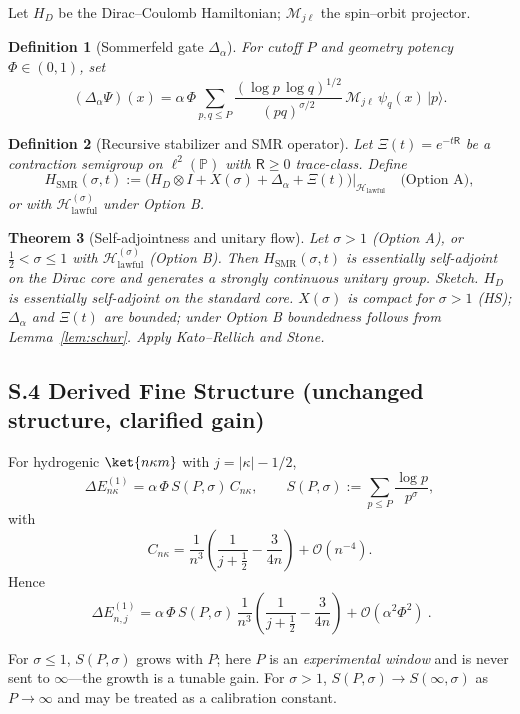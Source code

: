 \documentclass[12]{amsart}
\newtheorem{theorem}{Theorem}
\theoremstyle{plain}
\newtheorem{definition}[theorem]{Definition}
\begin{document}
Let $H_D$ be the Dirac–Coulomb Hamiltonian; $\mathcal M_{j\ell}$ the spin–orbit projector.

\begin{definition}[Sommerfeld gate $\Delta_\alpha$]
For cutoff $P$ and geometry potency $\Phi\in(0,1)$, set
\[
(\Delta_\alpha \Psi)(x)
=\alpha\,\Phi\sum_{p,q\le P}\frac{(\log p\,\log q)^{1/2}}{(pq)^{\sigma/2}}\,
\mathcal M_{j\ell}\,\psi_q(x)\,|p\rangle.
\]
\end{definition}

\begin{definition}[Recursive stabilizer and SMR operator]
Let $\Xi(t)=e^{-t\mathsf R}$ be a contraction semigroup on $\ell^2(\mathbb P)$ with $\mathsf R\ge 0$ trace-class. Define
\[
H_{\mathrm{SMR}}(\sigma,t):=\big(H_D\otimes I + X(\sigma)+\Delta_\alpha+\Xi(t)\big)\big|_{\mathcal H_{\mathrm{lawful}}}
\quad\text{(Option A)},
\]
or with $\mathcal H_{\mathrm{lawful}}^{(\sigma)}$ under Option B.
\end{definition}

\begin{theorem}[Self-adjointness and unitary flow]\label{thm:sa-new}
Let $\sigma>1$ (Option A), or $\tfrac12<\sigma\le 1$ with $\mathcal H_{\mathrm{lawful}}^{(\sigma)}$ (Option B).
Then $H_{\mathrm{SMR}}(\sigma,t)$ is essentially self-adjoint on the Dirac core and generates a strongly continuous unitary group.
\emph{Sketch.} $H_D$ is essentially self-adjoint on the standard core. $X(\sigma)$ is compact for $\sigma>1$ (HS); $\Delta_\alpha$ and $\Xi(t)$ are bounded; under Option B boundedness follows from Lemma~\ref{lem:schur}. Apply Kato–Rellich and Stone.
\end{theorem}

\subsection*{S.4 Derived Fine Structure (unchanged structure, clarified gain)}

For hydrogenic $\ket{n\kappa m}$ with $j=|\kappa|-1/2$,
\[
\Delta E_{n\kappa}^{(1)}=\alpha\,\Phi\,S(P,\sigma)\,C_{n\kappa},\qquad
S(P,\sigma):=\sum_{p\le P}\frac{\log p}{p^\sigma},
\]
with
\[
C_{n\kappa}=\frac{1}{n^3}\!\left(\frac{1}{j+\tfrac12}-\frac{3}{4n}\right)+\mathcal O(n^{-4}).
\]
Hence
\[
\boxed{\ \Delta E_{n,j}^{(1)}=\alpha\,\Phi\,S(P,\sigma)\,\frac{1}{n^3}
\!\left(\frac{1}{j+\tfrac12}-\frac{3}{4n}\right)+\mathcal O(\alpha^2\Phi^2)\ }.
\]

\begin{remark}
For $\sigma\le 1$, $S(P,\sigma)$ grows with $P$; here $P$ is an \emph{experimental window} and is never sent to $\infty$—the growth is a tunable gain. For $\sigma>1$, $S(P,\sigma)\to S(\infty,\sigma)$ as $P\to\infty$ and may be treated as a calibration constant.
\end{remark}
\end{document}
